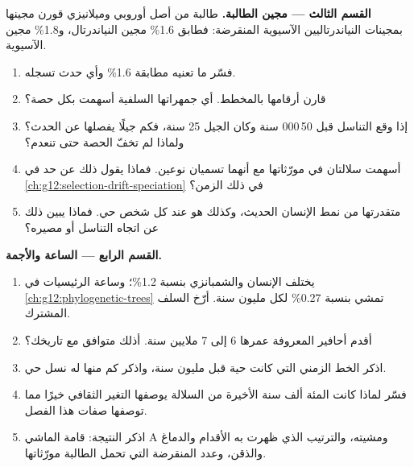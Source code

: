 \begin{problem}
\medskip
\noindent\textbf{القسم الثالث --- مجين الطالبة.}
طالبة من أصل أوروبي وميلانيزي قورن مجينها بمجينات النياندرتاليين
 الآسيوية المنقرضة: فطابق 1.6\% مجين النياندرتال، و1.8\% مجين
 الآسيوية.
\begin{enumerate}[resume]
  \item فسّر ما تعنيه مطابقة 1.6\% وأي حدث تسجله.
  \item قارن أرقامها بالمخطط. أي جمهراتها السلفية أسهمت بكل حصة؟
  \item إذا وقع التناسل قبل 50\,000 سنة وكان الجيل 25 سنة، فكم جيلًا
        يفصلها عن الحدث؟ ولماذا لم تخفّ الحصة حتى تنعدم؟
  \item أسهمت سلالتان  في مورّثاتها مع أنهما تسميان نوعين.
        فماذا يقول ذلك عن حد  في
        \cref{ch:g12:selection-drift-speciation} في ذلك الزمن؟
  \item {} متقدرتها من نمط الإنسان الحديث، وكذلك هو عند كل شخص حي.
        فماذا يبين ذلك عن اتجاه التناسل أو مصيره؟
\end{enumerate}

\medskip
\noindent\textbf{القسم الرابع --- الساعة والأجمة.}
\begin{enumerate}[resume]
  \item يختلف  الإنسان والشمبانزي بنسبة 1.2\%؛ وساعة الرئيسيات في
        \cref{ch:g12:phylogenetic-trees} تمشي بنسبة 0.27\% لكل مليون
        سنة. أرّخ السلف المشترك.
  \item أقدم أحافير  المعروفة عمرها 6 إلى 7 ملايين
        سنة. أذلك متوافق مع تاريخك؟
  \item اذكر  الخط الزمني التي كانت حية قبل مليون سنة، واذكر كم
        منها له نسل حي.
  \item فسّر لماذا كانت المئة ألف سنة الأخيرة من السلالة يوصفها التغير
        الثقافي خيرًا مما توصفها صفات هذا الفصل.
  \item اذكر النتيجة: قامة الماشي A ومشيته، والترتيب الذي ظهرت به
        الأقدام والدماغ والذقن، وعدد  المنقرضة التي تحمل
        الطالبة مورّثاتها.
\end{enumerate}
\end{problem}
